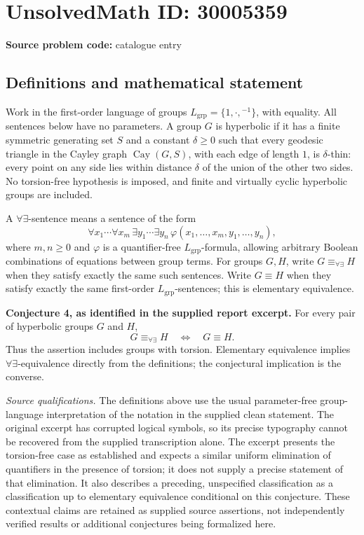 \documentclass[11pt]{article}
\begin{document}
\section*{UnsolvedMath ID: 30005359}
\textbf{Source problem code:} catalogue entry
\subsection{Definitions and mathematical statement}
Work in the first-order language of groups \(L_{\mathrm{grp}}=\{1,\cdot,{}^{-1}\}\), with equality. All sentences below have no parameters. A group \(G\) is hyperbolic if it has a finite symmetric generating set \(S\) and a constant \(\delta\geq 0\) such that every geodesic triangle in the Cayley graph \(\operatorname{Cay}(G,S)\), with each edge of length \(1\), is \(\delta\)-thin: every point on any side lies within distance \(\delta\) of the union of the other two sides. No torsion-free hypothesis is imposed, and finite and virtually cyclic hyperbolic groups are included.

A \(\forall\exists\)-sentence means a sentence of the form
\[
\forall x_1\cdots\forall x_m\,\exists y_1\cdots\exists y_n\,
\varphi(x_1,\ldots,x_m,y_1,\ldots,y_n),
\]
where \(m,n\geq 0\) and \(\varphi\) is a quantifier-free \(L_{\mathrm{grp}}\)-formula, allowing arbitrary Boolean combinations of equations between group terms. For groups \(G,H\), write \(G\equiv_{\forall\exists}H\) when they satisfy exactly the same such sentences. Write \(G\equiv H\) when they satisfy exactly the same first-order \(L_{\mathrm{grp}}\)-sentences; this is elementary equivalence.

\textbf{Conjecture 4, as identified in the supplied report excerpt.} For every pair of hyperbolic groups \(G\) and \(H\),
\[
G\equiv_{\forall\exists}H
\quad\Longleftrightarrow\quad
G\equiv H.
\]
Thus the assertion includes groups with torsion. Elementary equivalence implies \(\forall\exists\)-equivalence directly from the definitions; the conjectural implication is the converse.

\textit{Source qualifications.} The definitions above use the usual parameter-free group-language interpretation of the notation in the supplied clean statement. The original excerpt has corrupted logical symbols, so its precise typography cannot be recovered from the supplied transcription alone. The excerpt presents the torsion-free case as established and expects a similar uniform elimination of quantifiers in the presence of torsion; it does not supply a precise statement of that elimination. It also describes a preceding, unspecified classification as a classification up to elementary equivalence conditional on this conjecture. These contextual claims are retained as supplied source assertions, not independently verified results or additional conjectures being formalized here.
\end{document}

